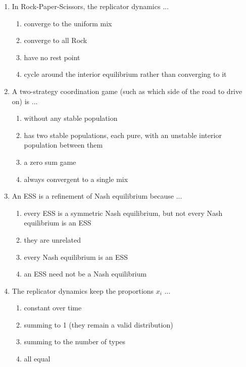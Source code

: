 \documentclass[11pt]{article}
\begin{document}
\begin{enumerate}[itemsep=6pt]
  \begin{enumerate}
    \item \(x + y\)
    \item \(\epsilon y\)
    \item \(x - y\)
    \item \(x + \epsilon(y - x)\)
  \end{enumerate}
  \item In Rock-Paper-Scissors, the replicator dynamics ...
  \begin{enumerate}
    \item converge to the uniform mix
    \item converge to all Rock
    \item have no rest point
    \item cycle around the interior equilibrium rather than converging to it
  \end{enumerate}
  \item A two-strategy coordination game (such as which side of the road to drive on) is ...
  \begin{enumerate}
    \item without any stable population
    \item has two stable populations, each pure, with an unstable interior population between them
    \item a zero sum game
    \item always convergent to a single mix
  \end{enumerate}
  \item An ESS is a refinement of Nash equilibrium because ...
  \begin{enumerate}
    \item every ESS is a symmetric Nash equilibrium, but not every Nash equilibrium is an ESS
    \item they are unrelated
    \item every Nash equilibrium is an ESS
    \item an ESS need not be a Nash equilibrium
  \end{enumerate}
  \item The replicator dynamics keep the proportions \(x_i\) ...
  \begin{enumerate}
    \item constant over time
    \item summing to 1 (they remain a valid distribution)
    \item summing to the number of types
    \item all equal

\end{enumerate}
\end{enumerate}
\end{document}

